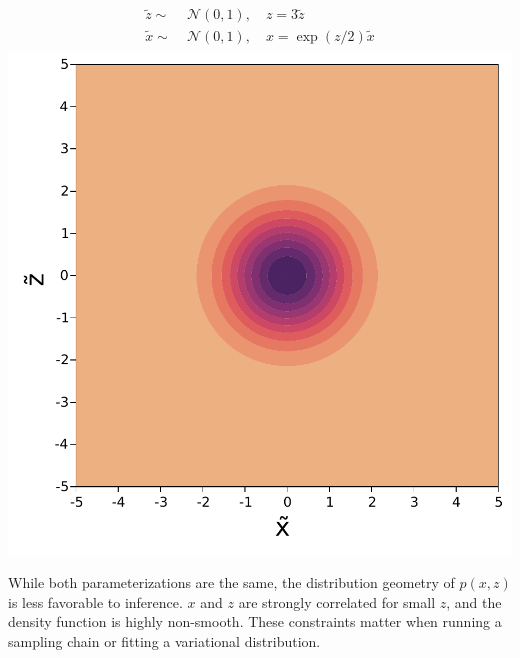 \begin{minipage}{0.5\textwidth}
    \centering
    \begin{align}
        \begin{aligned}
            \tilde{z} \sim&\; \mathcal{N}(0, 1),\quad z = 3\tilde{z}\\
            \tilde{x} \sim&\; \mathcal{N}(0, 1),\quad x = \exp(z/2)\tilde{x}
        \end{aligned}
    \end{align}
    \includegraphics[width=\textwidth]{./chapters/1_introduction/figures/neals_funnel_non_centered.pdf}
    \label{fig:neals_noncentered}
\end{minipage}
\vspace{0.5cm}
While both parameterizations are the same, the distribution geometry of $p(x,z)$ is less favorable to inference.
$x$ and $z$ are strongly correlated for small $z$, and the density function is highly non-smooth.
These constraints matter when running a sampling chain or fitting a variational distribution.

